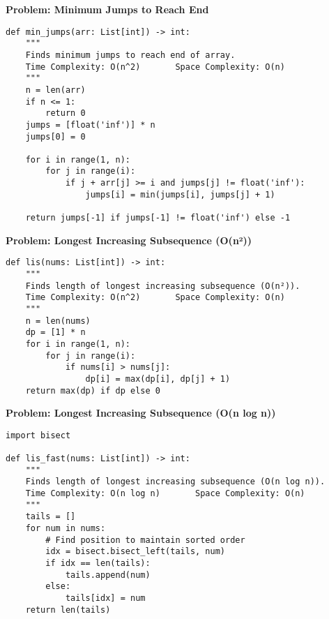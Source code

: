 \noindent\textbf{Problem: Minimum Jumps to Reach End}
\begin{verbatim}
def min_jumps(arr: List[int]) -> int:
    """
    Finds minimum jumps to reach end of array.
    Time Complexity: O(n^2)       Space Complexity: O(n)
    """
    n = len(arr)
    if n <= 1:
        return 0
    jumps = [float('inf')] * n
    jumps[0] = 0
    
    for i in range(1, n):
        for j in range(i):
            if j + arr[j] >= i and jumps[j] != float('inf'):
                jumps[i] = min(jumps[i], jumps[j] + 1)
    
    return jumps[-1] if jumps[-1] != float('inf') else -1
\end{verbatim}
\begin{center}
\end{center}

\noindent\textbf{Problem: Longest Increasing Subsequence (O(n²))}
\begin{verbatim}
def lis(nums: List[int]) -> int:
    """
    Finds length of longest increasing subsequence (O(n²)).
    Time Complexity: O(n^2)       Space Complexity: O(n)
    """
    n = len(nums)
    dp = [1] * n
    for i in range(1, n):
        for j in range(i):
            if nums[i] > nums[j]:
                dp[i] = max(dp[i], dp[j] + 1)
    return max(dp) if dp else 0
\end{verbatim}

\noindent\textbf{Problem: Longest Increasing Subsequence (O(n log n))}
\begin{verbatim}
import bisect

def lis_fast(nums: List[int]) -> int:
    """
    Finds length of longest increasing subsequence (O(n log n)).
    Time Complexity: O(n log n)       Space Complexity: O(n)
    """
    tails = []
    for num in nums:
        # Find position to maintain sorted order
        idx = bisect.bisect_left(tails, num)
        if idx == len(tails):
            tails.append(num)
        else:
            tails[idx] = num
    return len(tails)
\end{verbatim}

